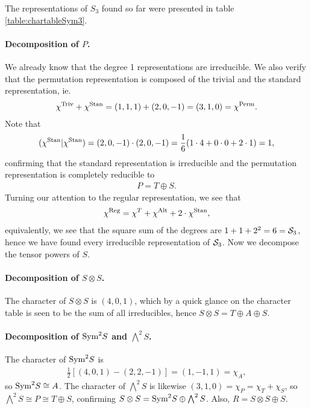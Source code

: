 \begin{example}
	The representations of $S_3$ found so far were presented in table \ref{table:chartableSym3}.
	
	\paragraph{Decomposition of $P$.} We already know that the degree 1 representations are irreducible. We also verify that the permutation representation is composed of the trivial and the standard representation, ie.
	\begin{align*}
		\chi^{\text{Triv}} + \chi^{\text{Stan}} = (1,1,1) + (2,0,-1) = (3,1,0) = \chi^{\text{Perm}}.
	\end{align*}
	Note that
	\begin{align*}
		(\chi^{\text{Stan}}|\chi^{\text{Stan}}) = (2,0,-1)\cdot (2,0,-1) = \frac{1}{6}(1 \cdot 4 + 0 \cdot 0 + 2\cdot 1) = 1,
	\end{align*}
	confirming that the standard representation is irreducible and the permutation representation is completely reducible to 
	\begin{align*}
		P = T \oplus S.
	\end{align*}
	Turning our attention to the regular representation, we see that 
	\begin{align*}
		\chi^{\text{Reg}} = \chi^T + \chi^{\text{Alt}} + 2 \cdot \chi^{\text{Stan}},
	\end{align*}
	equivalently, we see that the square sum of the degrees are $1 + 1 +2^2 = 6 = \mathcal{S}_3$, hence we have found every irreducible representation of $\mathcal{S}_3$. Now we decompose the tensor powers of $S$.
		
	\paragraph{Decomposition of $S \otimes S$.} The character of $S \otimes S$ is $(4,0,1)$, which by a quick glance on the character table is seen to be the sum of all irreducibles, hence $S \otimes S = T \oplus A \oplus S$.
	
	\paragraph{Decomposition of $\text{Sym}^2S$ and $\bigwedge^2S$.} The character of $\text{Sym}^2S$ is 
	\begin{align*}
		\frac{1}{2}\left[ (4,0,1) - (2,2,-1) \right] = (1,-1,1) = \chi_A,
	\end{align*} so $\text{Sym}^2S \cong A$. The character of $\bigwedge^2S$ is likewise $(3,1,0) = \chi_P = \chi_T + \chi_S$, so $\bigwedge^2S \cong P \cong T \oplus S$, confirming $S \otimes S = \text{Sym}^2S \oplus \bigwedge^2S$. Also, $R = S \otimes S \oplus S$.
	

\end{example}
